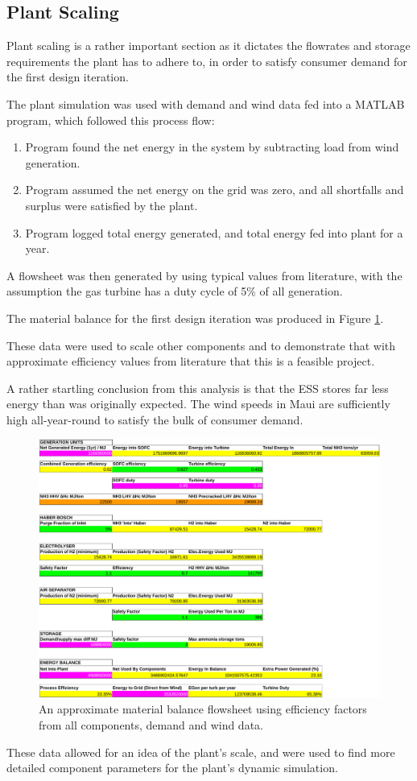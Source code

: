 \subsection{Plant Scaling}
\label{sec:plantscale}

Plant scaling is a rather important section as it dictates the flowrates and storage requirements the plant has to adhere to, in order to satisfy consumer demand for the first design iteration.

The plant simulation was used with demand and wind data fed into a MATLAB program, which followed this process flow:
\begin{enumerate}
    \item Program found the net energy in the system by subtracting load from wind generation.
    \item Program assumed the net energy on the grid was zero, and all shortfalls and surplus were satisfied by the plant.
    \item Program logged total energy generated, and total energy fed into plant for a year.
\end{enumerate}

A flowsheet was then generated by using typical values from literature, with the assumption the gas turbine has a duty cycle of 5\% of all generation.

The material balance for the first design iteration was produced in Figure \ref{flowsheettbl}.

These data were used to scale other components and to demonstrate that with approximate efficiency values from literature that this is a feasible project.

A rather startling conclusion from this analysis is that the ESS stores far less energy than was originally expected.
The wind speeds in Maui are sufficiently high all-year-round to satisfy the bulk of consumer demand.

\begin{figure}[tbh]
    \centering
    \includegraphics[scale=0.9]{images/flowtable.pdf}
    \caption{An approximate material balance flowsheet using efficiency factors from all components, demand and wind data.}
    \label{flowsheettbl}
\end{figure}

These data allowed for an idea of the plant's scale, and were used to find more detailed component parameters for the plant's dynamic simulation. 